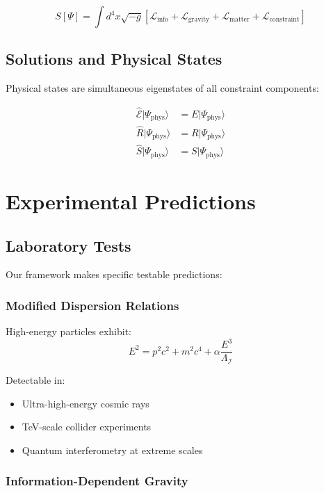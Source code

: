 \documentclass[11pt,a4paper]{article}
\theoremstyle{definition}
\begin{document}
\begin{equation}
S[\Psi] = \int d^4x \sqrt{-g} \left[\mathcal{L}_{\text{info}} + \mathcal{L}_{\text{gravity}} + \mathcal{L}_{\text{matter}} + \mathcal{L}_{\text{constraint}}\right]
\end{equation}

\subsection{Solutions and Physical States}

Physical states are simultaneous eigenstates of all constraint components:

\begin{align}
\hat{\mathcal{E}}|\Psi_{\text{phys}}\rangle &= E|\Psi_{\text{phys}}\rangle\\
\hat{R}|\Psi_{\text{phys}}\rangle &= R|\Psi_{\text{phys}}\rangle\\
\hat{S}|\Psi_{\text{phys}}\rangle &= S|\Psi_{\text{phys}}\rangle
\end{align}

\section{Experimental Predictions}

\subsection{Laboratory Tests}

Our framework makes specific testable predictions:

\subsubsection{Modified Dispersion Relations}

High-energy particles exhibit:
\begin{equation}
E^2 = p^2c^2 + m^2c^4 + \alpha\frac{E^3}{\Lambda_{\mathcal{I}}}
\end{equation}

Detectable in:
\begin{itemize}
\item Ultra-high-energy cosmic rays
\item TeV-scale collider experiments
\item Quantum interferometry at extreme scales
\end{itemize}

\subsubsection{Information-Dependent Gravity}
\end{document}

